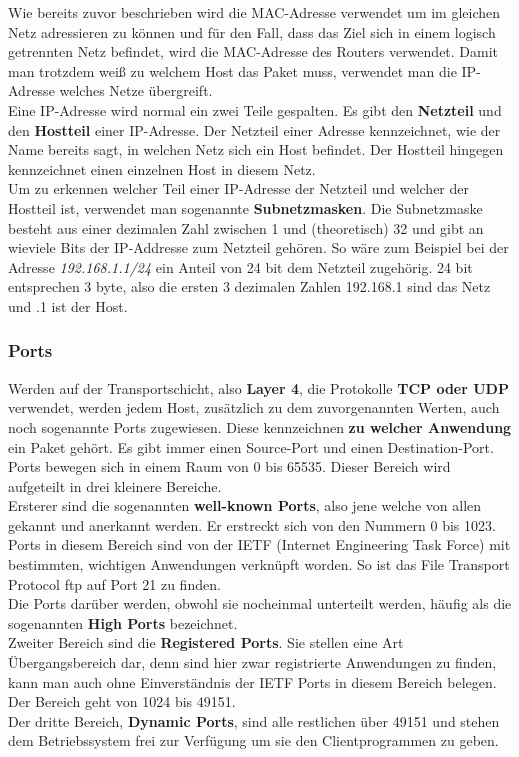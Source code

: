 \documentclass[12pt,a4paper]{report}
\begin{document}
Wie bereits zuvor beschrieben wird die MAC-Adresse verwendet um im gleichen Netz adressieren zu können und für den Fall, dass das Ziel sich in einem logisch getrennten Netz befindet, wird die MAC-Adresse des Routers verwendet. Damit man trotzdem weiß zu welchem Host das Paket muss, verwendet man die IP-Adresse welches Netze übergreift.\\

Eine IP-Adresse wird normal ein zwei Teile gespalten. Es gibt den \textbf{Netzteil} und den \textbf{Hostteil} einer IP-Adresse. Der Netzteil einer Adresse kennzeichnet, wie der Name bereits sagt, in welchen Netz sich ein Host befindet. Der Hostteil hingegen kennzeichnet einen einzelnen Host in diesem Netz.\\
Um zu erkennen welcher Teil einer IP-Adresse der Netzteil und welcher der Hostteil ist, verwendet man sogenannte \textbf{Subnetzmasken}. Die Subnetzmaske besteht aus einer dezimalen Zahl zwischen 1 und (theoretisch) 32 und gibt an wieviele Bits der IP-Addresse zum Netzteil gehören. So wäre zum Beispiel bei der Adresse \textit{192.168.1.1/24} ein Anteil von 24 bit dem Netzteil zugehörig. 24 bit entsprechen 3 byte, also die ersten 3 dezimalen Zahlen 192.168.1 sind das Netz und .1 ist der Host.
\subsubsection{Ports}
Werden auf der Transportschicht, also \textbf{Layer 4}, die Protokolle \textbf{TCP oder UDP} verwendet, werden jedem Host, zusätzlich zu dem zuvorgenannten Werten, auch noch sogenannte Ports zugewiesen. Diese kennzeichnen \textbf{zu welcher Anwendung} ein Paket gehört. Es gibt immer einen Source-Port und einen Destination-Port.\\
Ports bewegen sich in einem Raum von 0 bis 65535. Dieser Bereich wird aufgeteilt in drei kleinere Bereiche.\\
Ersterer sind die sogenannten \textbf{well-known Ports}, also jene welche von allen gekannt und anerkannt werden. Er erstreckt sich von den Nummern 0 bis 1023. Ports in diesem Bereich sind von der IETF (Internet Engineering Task Force) mit bestimmten, wichtigen Anwendungen verknüpft worden. So ist das File Transport Protocol ftp auf Port 21 zu finden.\\
Die Ports darüber werden, obwohl sie nocheinmal unterteilt werden, häufig als die sogenannten \textbf{High Ports} bezeichnet.\\
Zweiter Bereich sind die \textbf{Registered Ports}. Sie stellen eine Art Übergangsbereich dar, denn sind hier zwar registrierte Anwendungen zu finden, kann man auch ohne Einverständnis der IETF Ports in diesem Bereich belegen. Der Bereich geht von 1024 bis 49151.\\
Der dritte Bereich, \textbf{Dynamic Ports}, sind alle restlichen über 49151 und stehen dem Betriebssystem frei zur Verfügung um sie den Clientprogrammen zu geben.\\
\end{document}
